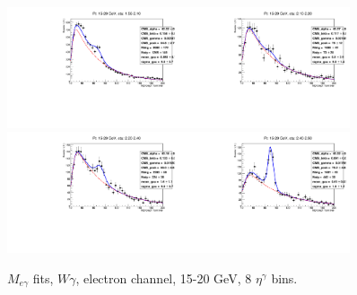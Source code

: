 \begin{figure}[htb]
\begin{center}
   \includegraphics[width=0.45\textwidth]{../figs/figs_v11/ELECTRON_WGamma/EtoGammaFits/sa_hZmass_h_Data_EtoGamma_Enr_ENDCAP_pt15to20_ieta0.pdf}\includegraphics[width=0.45\textwidth]{../figs/figs_v11/ELECTRON_WGamma/EtoGammaFits/sa_hZmass_h_Data_EtoGamma_Enr_ENDCAP_pt15to20_ieta1.pdf}\\
   \includegraphics[width=0.45\textwidth]{../figs/figs_v11/ELECTRON_WGamma/EtoGammaFits/sa_hZmass_h_Data_EtoGamma_Enr_ENDCAP_pt15to20_ieta2.pdf}\includegraphics[width=0.45\textwidth]{../figs/figs_v11/ELECTRON_WGamma/EtoGammaFits/sa_hZmass_h_Data_EtoGamma_Enr_ENDCAP_pt15to20_ieta3.pdf}\\
  \label{fig:etogFits_15to20}
  \caption{$M_{e\gamma}$ fits, $W\gamma$, electron channel, 15-20 GeV, 8 $\eta^{\gamma}$ bins.}
  \end{center}
\end{figure}

